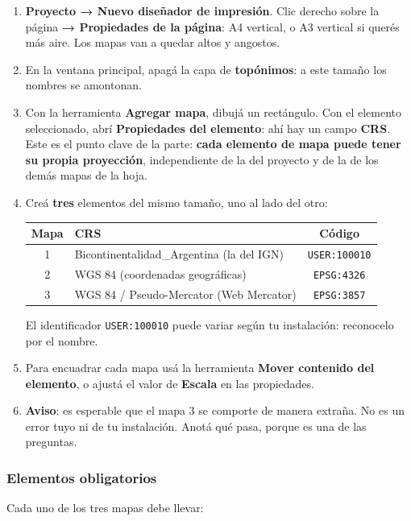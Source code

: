\documentclass{article}
\begin{document}
\begin{enumerate}
    \item \textbf{Proyecto → Nuevo diseñador de impresión}. Clic derecho sobre la página \textbf{→ Propiedades de la página}: A4 vertical, o A3 vertical si querés más aire. Los mapas van a quedar altos y angostos.
    \item En la ventana principal, apagá la capa de \textbf{topónimos}: a este tamaño los nombres se amontonan.
    \item Con la herramienta \textbf{Agregar mapa}, dibujá un rectángulo. Con el elemento seleccionado, abrí \textbf{Propiedades del elemento}: ahí hay un campo \textbf{CRS}. Este es el punto clave de la parte: \textbf{cada elemento de mapa puede tener su propia proyección}, independiente de la del proyecto y de la de los demás mapas de la hoja.
    \item Creá \textbf{tres} elementos del mismo tamaño, uno al lado del otro:
    \begin{center}
    \begin{tabular}{clc}
        \toprule
        Mapa & CRS & Código \\
        \midrule
        1 & Bicontinentalidad\_Argentina (la del IGN) & \texttt{USER:100010} \\
        2 & WGS 84 (coordenadas geográficas) & \texttt{EPSG:4326} \\
        3 & WGS 84 / Pseudo-Mercator (Web Mercator) & \texttt{EPSG:3857} \\
        \bottomrule
    \end{tabular}
    \end{center}
    El identificador \texttt{USER:100010} puede variar según tu instalación: reconocelo por el nombre.
    \item Para encuadrar cada mapa usá la herramienta \textbf{Mover contenido del elemento}, o ajustá el valor de \textbf{Escala} en las propiedades.
    \item \textbf{Aviso}: es esperable que el mapa 3 se comporte de manera extraña. No es un error tuyo ni de tu instalación. Anotá qué pasa, porque es una de las preguntas.
\end{enumerate}

\subsubsection*{Elementos obligatorios}

Cada uno de los tres mapas debe llevar:
\end{document}
